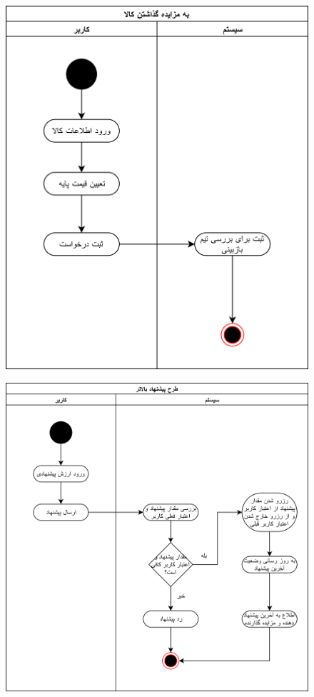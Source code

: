 \documentclass{article}
\begin{document}
\begin{figure}[htp]
\includegraphics[width = 1\textwidth]{../Activity Diagrams/Activity 1.png}
\caption{}
\label{activity1}
\end{figure}

\begin{figure}[htp]
\includegraphics[width = 1\textwidth]{../Activity Diagrams/Activity 2.png}
\caption{}
\label{activity2}
\end{figure}
\end{document}
